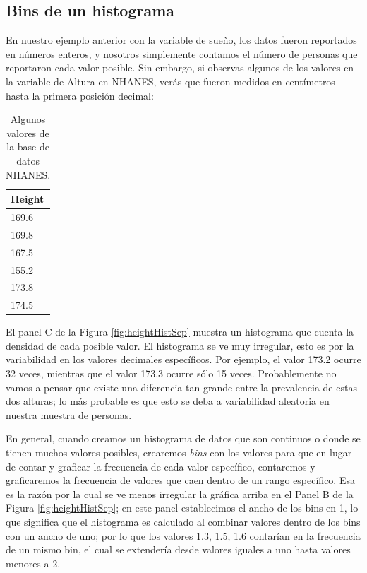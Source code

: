 \documentclass[
  12pt,
]{book}
\theoremstyle{definition}
\theoremstyle{definition}
\theoremstyle{definition}
\theoremstyle{remark}
\begin{document}
\hypertarget{bins-de-un-histograma}{%
\subsection{Bins de un histograma}\label{bins-de-un-histograma}}

En nuestro ejemplo anterior con la variable de sueño, los datos fueron reportados en números enteros, y nosotros simplemente contamos el número de personas que reportaron cada valor posible. Sin embargo, si observas algunos de los valores en la variable de Altura en NHANES, verás que fueron medidos en centímetros hasta la primera posición decimal:

\begin{table}

\caption{\label{tab:unnamed-chunk-10}Algunos valores de la base de datos NHANES.}
\centering
\begin{tabular}[t]{l}
\hline
Height\\
\hline
169.6\\
\hline
169.8\\
\hline
167.5\\
\hline
155.2\\
\hline
173.8\\
\hline
174.5\\
\hline
\end{tabular}
\end{table}

El panel C de la Figura \ref{fig:heightHistSep} muestra un histograma que cuenta la densidad de cada posible valor. El histograma se ve muy irregular, esto es por la variabilidad en los valores decimales específicos. Por ejemplo, el valor 173.2 ocurre 32 veces, mientras que el valor 173.3 ocurre sólo 15 veces. Probablemente no vamos a pensar que existe una diferencia tan grande entre la prevalencia de estas dos alturas; lo más probable es que esto se deba a variabilidad aleatoria en nuestra muestra de personas.

En general, cuando creamos un histograma de datos que son continuos o donde se tienen muchos valores posibles, crearemos \emph{bins} con los valores para que en lugar de contar y graficar la frecuencia de cada valor específico, contaremos y graficaremos la frecuencia de valores que caen dentro de un rango específico. Esa es la razón por la cual se ve menos irregular la gráfica arriba en el Panel B de la Figura \ref{fig:heightHistSep}; en este panel establecimos el ancho de los bins en 1, lo que significa que el histograma es calculado al combinar valores dentro de los bins con un ancho de uno; por lo que los valores 1.3, 1.5, 1.6 contarían en la frecuencia de un mismo bin, el cual se extendería desde valores iguales a uno hasta valores menores a 2.
\end{document}

